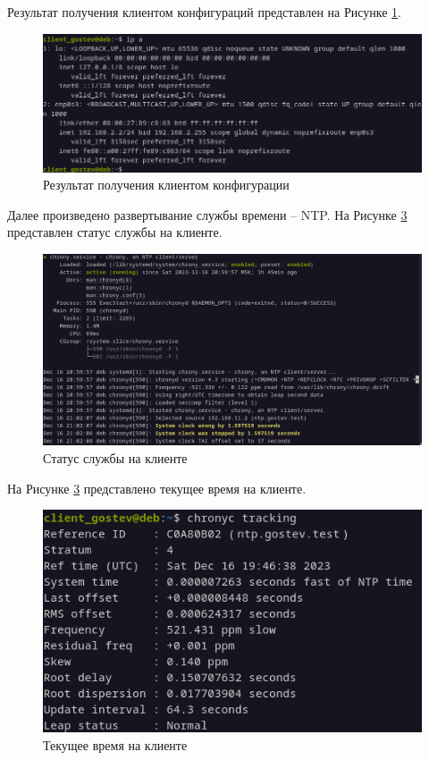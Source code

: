 \documentclass[14pt, a4paper]{extarticle}
\numberwithin{equation}{section}
\begin{document}
Результат получения клиентом конфигураций представлен на Рисунке \ref{fig:dhcp_proof}.

\begin{figure}[H]
        \centering
        \includegraphics[scale=0.8]{services/dhcp/clientproofdhcp.png}
        \caption{Результат получения клиентом конфигурации}
        \label{fig:dhcp_proof}
\end{figure}


Далее произведено развертывание службы времени -- NTP. 
На Рисунке \ref{fig:ntp_client_status} представлен статус службы на клиенте.
\begin{figure}[H]
        \centering
        \includegraphics[scale=0.7]{services/ntp/client_status.png}
        \caption{Статус службы на клиенте}
        \label{fig:ntp_client_status}
\end{figure}

На Рисунке \ref{fig:ntp_client_status} представлено текущее время на клиенте.
\begin{figure}[H]
        \centering
        \includegraphics[scale=1]{services/ntp/client_time.png}
        \caption{Текущее время на клиенте}
        \label{fig:ntp_client_status}
\end{figure}
\end{document}
